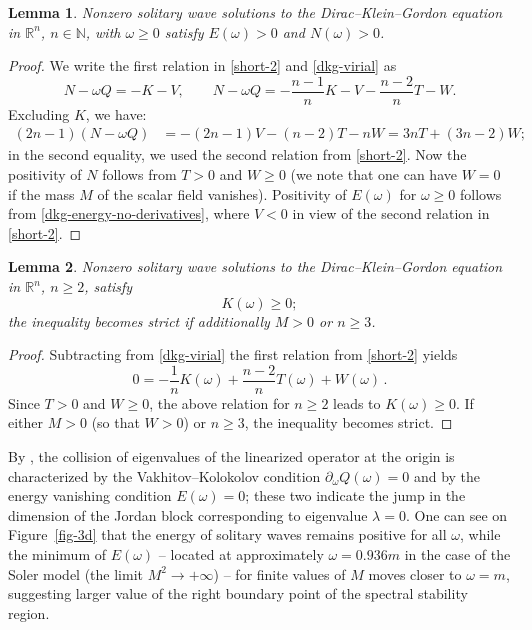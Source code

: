 \documentclass[12pt]{extarticle}
\newcommand{\p}{\partial}
\def\R{\mathbb{R}}
\newcommand{\N}{\mathbb{N}}
\theoremstyle{plain}
\newtheorem{lemma}{Lemma}[section]
\theoremstyle{remark}
\begin{document}
\begin{lemma}
\label{lemma-en}
Nonzero solitary wave solutions
to the Dirac--Klein--Gordon equation
in $\R^n$, $n\in\N$,
with $\omega\ge 0$
satisfy
$E(\omega)>0$
and $N(\omega)>0$.
\end{lemma}

\begin{proof}
We write the first relation
in \eqref{short-2}
and \eqref{dkg-virial}
as
\[
N-\omega Q=-K-V,
\qquad
N-\omega Q=
-\frac{n-1}{n}K-V-\frac{n-2}{n}T-W.
\]
Excluding $K$, we have:
\begin{align*}
(2n-1)(N-\omega Q)
&=
-(2n-1)V
-(n-2)T-n W
=3n T+(3n-2)W;
\end{align*}
in the second equality,
we used the second relation
from \eqref{short-2}.
Now the positivity of $N$ follows from
$T>0$ and $W\ge 0$
(we note that one can have $W=0$ if
the mass $M$ of the scalar field vanishes).
Positivity of
$E(\omega)$ for $\omega\ge 0$
follows from
\eqref{dkg-energy-no-derivatives},
where $V<0$
in view of the second
relation in \eqref{short-2}.
\end{proof}

\begin{lemma}
\label{lemma-no-negative-omega}
Nonzero solitary wave solutions
to the Dirac--Klein--Gordon equation in 
$\R^n$, $n\ge 2$,
satisfy
\[
K(\omega)\ge 0;
\]
the inequality becomes strict
if
additionally
$M>0$ or $n\ge 3$.
\end{lemma}

\begin{proof}
Subtracting from \eqref{dkg-virial}
the first relation from \eqref{short-2}
yields
\[
 0=-\frac{1}{n}K(\omega)
 +\frac{n-2}{n}T(\omega)+W(\omega)\,.
\]
Since
$T>0$ and $W\ge 0$,
the above relation for $n\ge 2$ leads to
$K(\omega)\ge 0$.
If either $M>0$ (so that $W>0$)
or $n\ge 3$,
the inequality becomes strict.
\end{proof}

By
\cite{berkolaiko2015vakhitov},
the collision of eigenvalues
of the linearized operator
at the origin
is characterized by
the Vakhitov--Kolokolov
condition
$\p_\omega Q(\omega)=0$
and by the energy vanishing condition
$E(\omega)=0$;
these two indicate the jump in the
dimension of the Jordan block
corresponding to eigenvalue $\lambda=0$.
One can see on
Figure~\ref{fig-3d}
that the energy of solitary waves
remains positive for all $\omega$,
while the minimum of $E(\omega)$
-- located at approximately
$\omega=0.936m$ in the case
of the Soler model (the limit $M^2\to+\infty$)
--
for finite values of $M$
moves closer to
$\omega=m$,
suggesting larger value of the
right boundary point of the spectral stability region.
\end{document}
